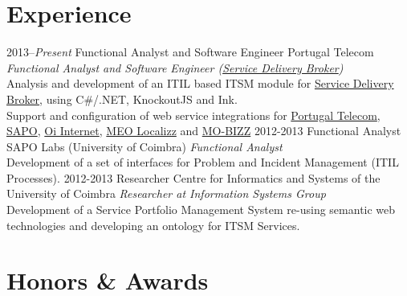 \documentclass[]{friggeri-cv} %
\begin{document}
\section{Experience}

\begin{entrylist}
\entry
{2013--\emph{Present}}
{Functional Analyst and Software Engineer}
{Portugal Telecom}
{\emph{Functional Analyst and Software Engineer (\href{http://sdb.sapo.pt/en/index.html}{Service Delivery Broker})}\\
Analysis and development of an ITIL based ITSM module for \href{http://sdb.sapo.pt/en/index.html}{Service Delivery Broker}, using C\#/.NET, KnockoutJS and Ink.\\
Support and configuration of web service integrations for \href{http://www.telecom.pt/InternetResource/PTSite/PT}{Portugal Telecom}, \href{http://www.sapo.pt/}{SAPO}, \href{http://www.oi.com.br/}{Oi Internet}, \href{https://meolocalizz.meo.pt}{MEO Localizz} and \href{http://www2.mobizz-project.eu/}{MO-BIZZ}}
\entry
{2012-2013}
{Functional Analyst}
{SAPO Labs (University of Coimbra)}
{\emph{Functional Analyst}\\
Development of a set of interfaces for Problem and Incident Management (ITIL Processes).}
\entry
{2012-2013}
{Researcher}
{Centre for Informatics and Systems of the University of Coimbra}
{\emph{Researcher at Information Systems Group}\\
Development of a Service Portfolio Management System re-using semantic web technologies and developing an ontology for ITSM Services.}

\end{entrylist}


\section{Honors \& Awards}
\end{document}
